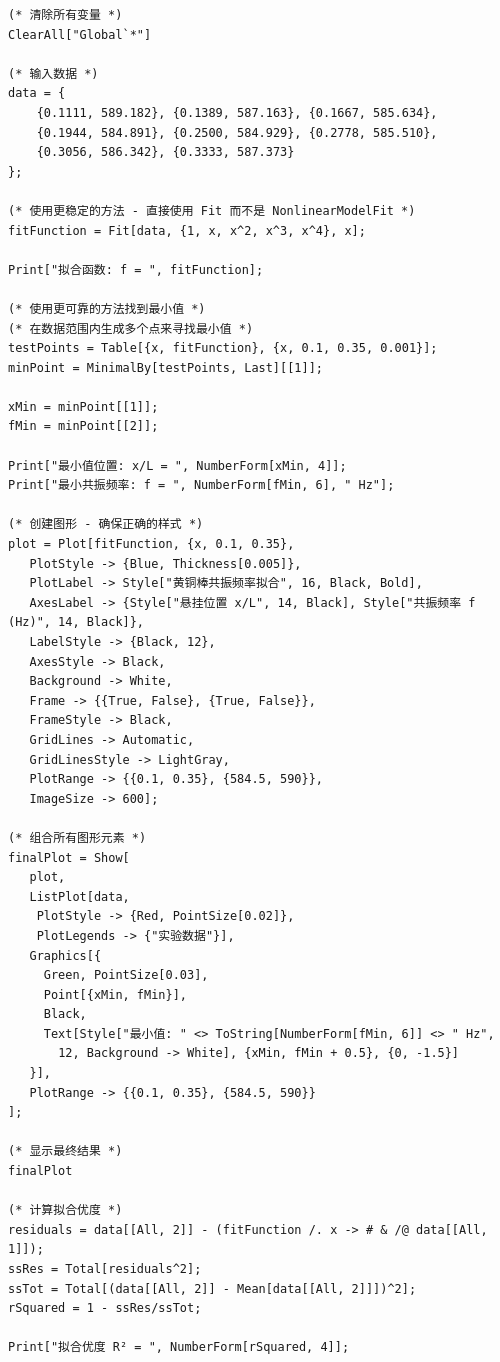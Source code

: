 \documentclass[11pt]{article}
\begin{document}
\begin{lstlisting}
(* 清除所有变量 *)
ClearAll["Global`*"]

(* 输入数据 *)
data = {
    {0.1111, 589.182}, {0.1389, 587.163}, {0.1667, 585.634},
    {0.1944, 584.891}, {0.2500, 584.929}, {0.2778, 585.510},
    {0.3056, 586.342}, {0.3333, 587.373}
};

(* 使用更稳定的方法 - 直接使用 Fit 而不是 NonlinearModelFit *)
fitFunction = Fit[data, {1, x, x^2, x^3, x^4}, x];

Print["拟合函数: f = ", fitFunction];

(* 使用更可靠的方法找到最小值 *)
(* 在数据范围内生成多个点来寻找最小值 *)
testPoints = Table[{x, fitFunction}, {x, 0.1, 0.35, 0.001}];
minPoint = MinimalBy[testPoints, Last][[1]];

xMin = minPoint[[1]];
fMin = minPoint[[2]];

Print["最小值位置: x/L = ", NumberForm[xMin, 4]];
Print["最小共振频率: f = ", NumberForm[fMin, 6], " Hz"];

(* 创建图形 - 确保正确的样式 *)
plot = Plot[fitFunction, {x, 0.1, 0.35}, 
   PlotStyle -> {Blue, Thickness[0.005]}, 
   PlotLabel -> Style["黄铜棒共振频率拟合", 16, Black, Bold],
   AxesLabel -> {Style["悬挂位置 x/L", 14, Black], Style["共振频率 f (Hz)", 14, Black]},
   LabelStyle -> {Black, 12},
   AxesStyle -> Black,
   Background -> White,
   Frame -> {{True, False}, {True, False}},
   FrameStyle -> Black,
   GridLines -> Automatic,
   GridLinesStyle -> LightGray,
   PlotRange -> {{0.1, 0.35}, {584.5, 590}},
   ImageSize -> 600];

(* 组合所有图形元素 *)
finalPlot = Show[
   plot,
   ListPlot[data, 
    PlotStyle -> {Red, PointSize[0.02]}, 
    PlotLegends -> {"实验数据"}],
   Graphics[{
     Green, PointSize[0.03], 
     Point[{xMin, fMin}],
     Black, 
     Text[Style["最小值: " <> ToString[NumberForm[fMin, 6]] <> " Hz", 
       12, Background -> White], {xMin, fMin + 0.5}, {0, -1.5}]
   }],
   PlotRange -> {{0.1, 0.35}, {584.5, 590}}
];

(* 显示最终结果 *)
finalPlot

(* 计算拟合优度 *)
residuals = data[[All, 2]] - (fitFunction /. x -> # & /@ data[[All, 1]]);
ssRes = Total[residuals^2];
ssTot = Total[(data[[All, 2]] - Mean[data[[All, 2]]])^2];
rSquared = 1 - ssRes/ssTot;

Print["拟合优度 R² = ", NumberForm[rSquared, 4]];

    \end{lstlisting}
\end{document}
